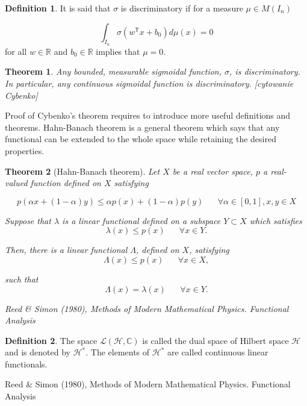 \documentclass[]{article}
\newtheorem{theorem}{Theorem}[section]
\theoremstyle{definition}
\newtheorem{definition}{Definition}[section]
\begin{document}
\begin{definition}
It is said that $\sigma$ is discriminatory if for a measure $\mu \in M(I_n)$ 

\begin{equation}
\int_{I_n} \sigma \left( w^\mathsf{T}x + b_0 \right) d\mu(x) = 0
\end{equation}
for all $w\in \mathbb{R}$ and $b_0 \in \mathbb{R}$ implies that $\mu = 0$.
	
\end{definition}


\begin{theorem}
Any bounded, measurable sigmoidal function, $\sigma$, is discriminatory. In particular, any continuous sigmoidal function is discriminatory.
[cytowanie Cybenko]
\end{theorem}


Proof of Cybenko's theorem requires to introduce more useful definitions and theorems. Hahn-Banach theorem is a general theorem which says that any functional can be extended to the whole space while retaining the desired properties.


\begin{theorem}[Hahn-Banach theorem]
	
	
	Let $X$ be a real vector space, $p$ a real-valued function defined on $X$ satisfying 
	
	$$	p \left(\alpha x + (1-\alpha) y \right) \leq \alpha p(x)  + (1 - \alpha)p(y) \;\;\;\;\;\; \forall \alpha \in \left[0,1\right], x, y \in X$$
	
	Suppose that $\lambda$ is a linear functional defined on a subspace $Y\subset X $ which satisfies 
	$$\lambda(x) \leq p(x) \;\;\;\;\;\; \forall x \in Y.$$
	
	Then, there is a linear functional $\Lambda$, defined on $X$, satisfying 
	$$\Lambda(x) \leq p(x) \;\;\;\;\;\; \forall x \in X,$$
	
	such that $$\Lambda(x) = \lambda(x) \;\;\;\;\;\; \forall x \in Y.$$
	

Reed \& Simon (1980), Methods of Modern Mathematical Physics. Functional Analysis
\end{theorem}


\begin{definition}	
	The space $\mathcal{L}\left(\mathcal{H}, \mathbb{C}\right)$ is called the dual space of Hilbert space $\mathcal{H}$ and is denoted by $\mathcal{H^*}$. The elements of $\mathcal{H^*}$ are called continuous linear functionals. 
	
Reed \& Simon (1980), Methods of Modern Mathematical Physics. Functional Analysis
	
\end{definition}	
\end{document}
